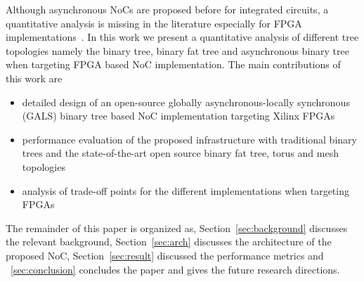 Although asynchronous NoCs are proposed before for integrated circuits, a quantitative analysis is missing in the literature especially for FPGA implementations~\cite{Bjerregaard2005, USP2011}.
In this work we present a quantitative analysis of different tree topologies namely the binary tree, binary fat tree and asynchronous binary tree when targeting FPGA based NoC implementation. 
The main contributions of this work are
\begin{itemize}
\item detailed design of an open-source globally asynchronous-locally synchronous (GALS) binary tree based NoC implementation targeting Xilinx FPGAs
\item performance evaluation of the proposed infrastructure with traditional binary trees and the state-of-the-art open source binary fat tree, torus and mesh topologies
\item analysis of trade-off points for the different implementations when targeting FPGAs
\end{itemize}
The remainder of this paper is organized as, Section~\ref{sec:background} discusses the relevant background, Section~\ref{sec:arch} discusses the architecture of the proposed NoC, Section~\ref{sec:result} discussed the performance metrics and ~\ref{sec:conclusion} concludes the paper and gives the future research directions.